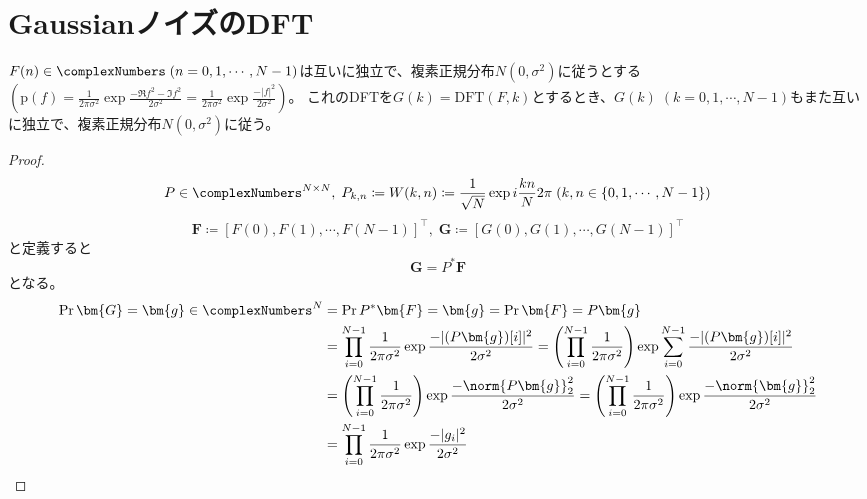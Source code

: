 			\section{GaussianノイズのDFT}
				\begin{shadebox}
					$F(n) \in \complexNumbers\;(n=0,1,\cdots,N-1)$は互いに独立で、複素正規分布$N(0,\sigma^2)$に従うとする$\left(\text{p}(f) = \frac{1}{2\pi\sigma^2}\exp\frac{-\Re{f}^2-\Im{f}^2}{2\sigma^2} = \frac{1}{2\pi\sigma^2}\exp\frac{-|f|^2}{2\sigma^2}\right)$。
					これのDFTを$G(k) = \text{DFT}(F,k)$とするとき、$G(k)\;(k=0,1,\cdots,N-1)$もまた互いに独立で、複素正規分布$N(0,\sigma^2)$に従う。
				\end{shadebox}
				\begin{proof}
					\[ P \in \complexNumbers^{N\times N},\; P_{k,n} \coloneqq W(k,n) \coloneqq \frac{1}{\sqrt{N}}\exp i\frac{kn}{N}2\pi\;(k,n \in \{0,1,\cdots,N-1\}) \]
					\[ \bm{F} \coloneqq [F(0), F(1), \cdots, F(N-1)]^\top,\;\bm{G} \coloneqq [G(0), G(1), \cdots, G(N-1)]^\top \]
					と定義すると
					\[ \bm{G} = P^*\bm{F} \]
					となる。
					\begin{align*}
						\Pr{\bm{G} = \bm{g} \in \complexNumbers^N} &= \Pr{P^*\bm{F} = \bm{g}} = \Pr{\bm{F} = P\bm{g}} \\
						&= \prod_{i=0}^{N-1}\frac{1}{2\pi\sigma^2} \exp\frac{-|(P\bm{g})[i]|^2}{2\sigma^2} = \left(\prod_{i=0}^{N-1}\frac{1}{2\pi\sigma^2}\right) \exp \sum_{i=0}^{N-1} \frac{-|(P\bm{g})[i]|^2}{2\sigma^2} \\
						&= \left(\prod_{i=0}^{N-1}\frac{1}{2\pi\sigma^2}\right) \exp \frac{-\norm{P\bm{g}}_2^2}{2\sigma^2} = \left(\prod_{i=0}^{N-1}\frac{1}{2\pi\sigma^2}\right) \exp \frac{-\norm{\bm{g}}_2^2}{2\sigma^2} \\
						&= \prod_{i=0}^{N-1}\frac{1}{2\pi\sigma^2} \exp \frac{-|g_i|^2}{2\sigma^2}
					\end{align*}
				\end{proof}


